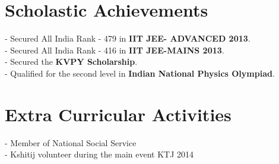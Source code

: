 \documentclass[a4paper,10pt]{article} %
\begin{document}

\section{Scholastic Achievements}

\hspace*{0.5cm}- Secured All India Rank - 479 in \textbf{IIT JEE- ADVANCED 2013}.\\
\hspace*{0.5cm}- Secured All India Rank - 416 in \textbf{IIT JEE-MAINS 2013}.\\
\hspace*{0.5cm}- Secured the \textbf{KVPY Scholarship}.\\
\hspace*{0.5cm}- Qualified for the second level in \textbf{Indian National Physics Olympiad}.\\


\section{Extra Curricular Activities}

\hspace*{0.5cm}- Member of National Social Service\\
\hspace*{0.5cm}- Kshitij volunteer during the main event KTJ 2014\\


\end{document}
